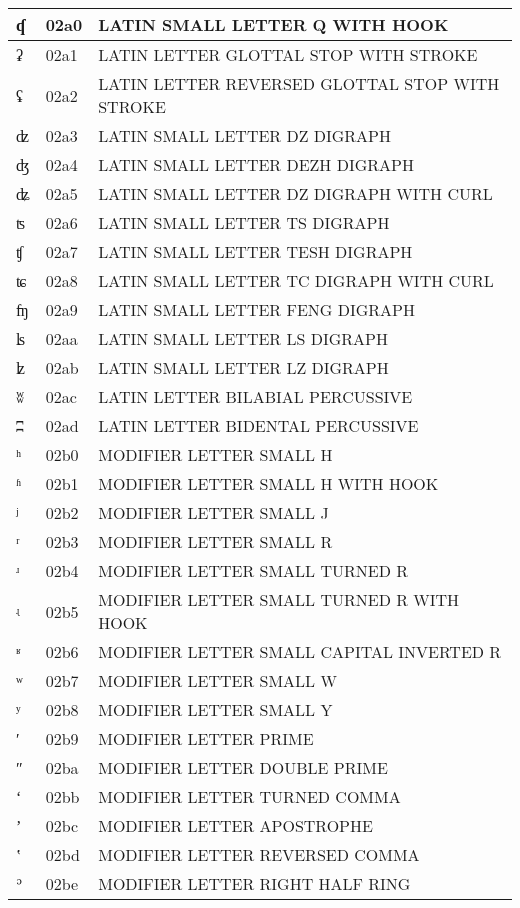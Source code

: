 \documentclass[12pt,letterpaper,openany]{book}
\begin{document}
\begin{center}
\begin{supertabular}{|m{0.25in}|m{0.5in}|m{4in}|}
ʠ & 02a0 & LATIN SMALL LETTER Q WITH HOOK\\\hline
ʡ & 02a1 & LATIN LETTER GLOTTAL STOP WITH STROKE\\\hline
ʢ & 02a2 & LATIN LETTER REVERSED GLOTTAL STOP WITH STROKE\\\hline
ʣ & 02a3 & LATIN SMALL LETTER DZ DIGRAPH\\\hline
ʤ & 02a4 & LATIN SMALL LETTER DEZH DIGRAPH\\\hline
ʥ & 02a5 & LATIN SMALL LETTER DZ DIGRAPH WITH CURL\\\hline
ʦ & 02a6 & LATIN SMALL LETTER TS DIGRAPH\\\hline
ʧ & 02a7 & LATIN SMALL LETTER TESH DIGRAPH\\\hline
ʨ & 02a8 & LATIN SMALL LETTER TC DIGRAPH WITH CURL\\\hline
ʩ & 02a9 & LATIN SMALL LETTER FENG DIGRAPH\\\hline
ʪ & 02aa & LATIN SMALL LETTER LS DIGRAPH\\\hline
ʫ & 02ab & LATIN SMALL LETTER LZ DIGRAPH\\\hline
ʬ & 02ac & LATIN LETTER BILABIAL PERCUSSIVE\\\hline
ʭ & 02ad & LATIN LETTER BIDENTAL PERCUSSIVE\\\hline
ʰ & 02b0 & MODIFIER LETTER SMALL H\\\hline
ʱ & 02b1 & MODIFIER LETTER SMALL H WITH HOOK\\\hline
ʲ & 02b2 & MODIFIER LETTER SMALL J\\\hline
ʳ & 02b3 & MODIFIER LETTER SMALL R\\\hline
ʴ & 02b4 & MODIFIER LETTER SMALL TURNED R\\\hline
ʵ & 02b5 & MODIFIER LETTER SMALL TURNED R WITH HOOK\\\hline
ʶ & 02b6 & MODIFIER LETTER SMALL CAPITAL INVERTED R\\\hline
ʷ & 02b7 & MODIFIER LETTER SMALL W\\\hline
ʸ & 02b8 & MODIFIER LETTER SMALL Y\\\hline
ʹ & 02b9 & MODIFIER LETTER PRIME\\\hline
ʺ & 02ba & MODIFIER LETTER DOUBLE PRIME\\\hline
ʻ & 02bb & MODIFIER LETTER TURNED COMMA\\\hline
ʼ & 02bc & MODIFIER LETTER APOSTROPHE\\\hline
ʽ & 02bd & MODIFIER LETTER REVERSED COMMA\\\hline
ʾ & 02be & MODIFIER LETTER RIGHT HALF RING\\\hline

\end{supertabular}
\end{center}
\end{document}
